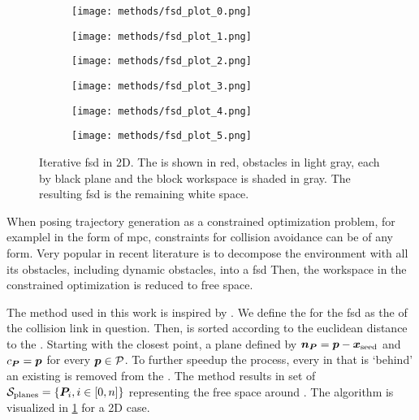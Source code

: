 \begin{figure}[ht]
  \centering
  \begin{subfigure}{0.33\linewidth}
    \centering
    \texttt{[image: methods/fsd\_plot\_0.png]}
    \caption{}%
  \end{subfigure}%
  \begin{subfigure}{0.33\linewidth}
    \centering
    \texttt{[image: methods/fsd\_plot\_1.png]}
    \caption{}
  \end{subfigure}%
  \begin{subfigure}{0.33\linewidth}
    \centering
    \texttt{[image: methods/fsd\_plot\_2.png]}
    \caption{}
  \end{subfigure}
  \begin{subfigure}{0.33\linewidth}
    \centering
    \texttt{[image: methods/fsd\_plot\_3.png]}
    \caption{}
  \end{subfigure}%
  \begin{subfigure}{0.33\linewidth}
    \centering
    \texttt{[image: methods/fsd\_plot\_4.png]}
    \caption{}
  \end{subfigure}%
  \begin{subfigure}{0.33\linewidth}
    \centering
    \texttt{[image: methods/fsd\_plot\_5.png]}
    \caption{}
  \end{subfigure}%
  \caption{Iterative \acl{fsd} in 2D. The \seed{} is shown in red, obstacles in
    light gray, each \plane{} by black plane and the block workspace is shaded
    in gray. The resulting \acs{fsd} is the remaining white space.
  }%
  \label{fig:fsd}
\end{figure}

When posing trajectory generation as a constrained optimization problem, for
examplel in the form of \ac{mpc}, constraints for collision avoidance can be of
any form. Very popular in recent literature
\cite{Tordesillas2019,Liu2017a,Spahn2021} is to decompose the environment with
all its obstacles, including dynamic obstacles, into a \ac{fsd} Then, the
workspace in the constrained optimization is reduced to free space. 

The method used in this work is inspired by \cite{Liu2017a}. We define the
\seed{} for the \ac{fsd} as the \fk{} of the collision link in question. Then,
\pointcloud{} is sorted according to the euclidean distance to the \seed{}.
Starting with the closest point, a plane \plane{} defined by $\bm{n}_{\bm{P}} = \bm{p} -
\bm{x}_{\textrm{seed}}$ and $c_{\bm{P}} = \bm{p}$ for every $\bm{p} \in \mathcal{P}$. To further
speedup the process, every \point{} in \pointcloud{} that is `behind' an
existing \plane{} is removed from the \pointcloud{}. The method results in set
of $\mathcal{S}_{\textrm{planes}} = \{\bm{P}_i, i\in[0,n]\}$ representing the free
space around \seed{}. The algorithm is visualized in \cref{fig:fsd} for a 2D
case.

